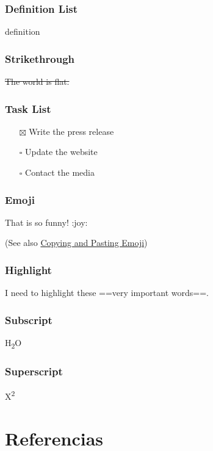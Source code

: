 \hypertarget{definition-list}{%
\subsubsection{Definition List}\label{definition-list}}

\begin{description}
\tightlist
\item[term]
definition
\end{description}

\hypertarget{strikethrough}{%
\subsubsection{Strikethrough}\label{strikethrough}}

\sout{The world is flat.}

\hypertarget{task-list}{%
\subsubsection{Task List}\label{task-list}}

\begin{itemize}
\tightlist
\item[$\boxtimes$]
  Write the press release
\item[$\square$]
  Update the website
\item[$\square$]
  Contact the media
\end{itemize}

\hypertarget{emoji}{%
\subsubsection{Emoji}\label{emoji}}

That is so funny! :joy:

(See also
\href{https://www.markdownguide.org/extended-syntax/\#copying-and-pasting-emoji}{Copying
and Pasting Emoji})

\hypertarget{highlight}{%
\subsubsection{Highlight}\label{highlight}}

I need to highlight these ==very important words==.

\hypertarget{subscript}{%
\subsubsection{Subscript}\label{subscript}}

H\textsubscript{2}O

\hypertarget{superscript}{%
\subsubsection{Superscript}\label{superscript}}

X\textsuperscript{2}

\hypertarget{referencias}{%
\section{Referencias}\label{referencias}}
